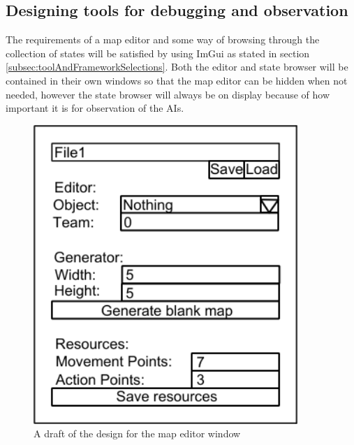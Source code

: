 \documentclass[11pt, a4paper]{report}
\begin{document}
\subsection{Designing tools for debugging and observation}
\label{subsec:designingTools}

The requirements of a map editor and some way of browsing through the collection of states will be satisfied by using ImGui \parencite{Imgui} as stated in section \ref{subsec:toolAndFrameworkSelections}. Both the editor and state browser will be contained in their own windows so that the map editor can be hidden when not needed, however the state browser will always be on display because of how important it is for observation of the AIs.

\begin{figure}[!h]
  \centering
  \includegraphics[width=10cm]{img/map_editor.png}
  \caption{A draft of the design for the map editor window}
  \label{fig:mapEditor}
\end{figure}
\end{document}
